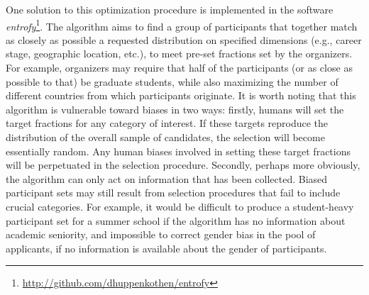 One solution to this optimization procedure is implemented in the software \textit{entrofy}\footnote{\url{http://github.com/dhuppenkothen/entrofy}}. The algorithm aims to find a group of participants that together match as closely as possible a requested distribution on specified dimensions (e.g., career stage, geographic location, etc.), to meet pre-set fractions set by the organizers.
For example, organizers may require that half of the participants (or as close as possible to that) be graduate students, while also maximizing the number of different countries from which participants originate.
It is worth noting that this algorithm is vulnerable toward biases in two ways: firstly, humans will set the target fractions for any category of interest.
If these targets reproduce the distribution of the overall sample of candidates, the selection will become essentially random.
Any human biases involved in setting these target fractions will be perpetuated in the selection procedure.
Secondly, perhaps more obviously, the algorithm can only act on information that has been collected.
Biased participant sets may still result from selection procedures that fail to include crucial categories. For example, it would be difficult to produce a student-heavy participant set for a summer school if the algorithm has no information about academic seniority, and impossible to correct gender bias in the pool of applicants, if no information is available about the gender of participants.
